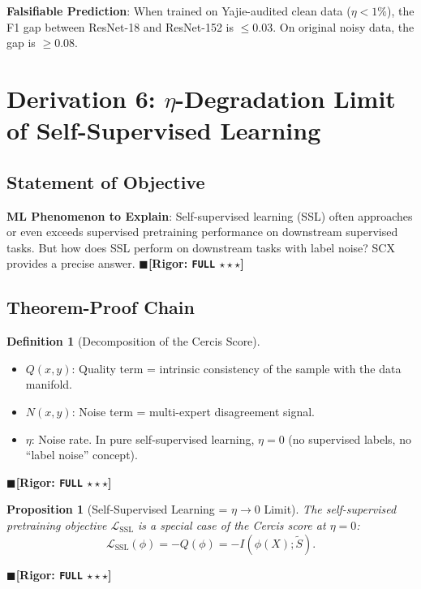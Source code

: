 \documentclass[12pt,a4paper]{article}
\newtheorem{proposition}[theorem]{Proposition}
\theoremstyle{definition}
\newtheorem{definition}{Definition}[section]
\theoremstyle{remark}
\newcommand{\rigorFull}{$\blacksquare$\;\textbf{[Rigor: \texttt{FULL} $\star\star\star$]}}
\begin{document}
\textbf{Falsifiable Prediction}: When trained on Yajie-audited clean data ($\eta < 1\%$), the F1 gap between ResNet-18 and ResNet-152 is $\leq 0.03$. On original noisy data, the gap is $\geq 0.08$.

\section{Derivation 6: $\eta$-Degradation Limit of Self-Supervised Learning}
\label{sec:ssl}

\subsection{Statement of Objective}
\textbf{ML Phenomenon to Explain}: Self-supervised learning (SSL) often approaches or even exceeds supervised pretraining performance on downstream supervised tasks. But how does SSL perform on downstream tasks with label noise? SCX provides a precise answer.
\rigorFull

\subsection{Theorem-Proof Chain}

\begin{definition}[Decomposition of the Cercis Score]
\begin{itemize}
\item $Q(x, y)$: Quality term = intrinsic consistency of the sample with the data manifold.
\item $N(x, y)$: Noise term = multi-expert disagreement signal.
\item $\eta$: Noise rate. In pure self-supervised learning, $\eta = 0$ (no supervised labels, no ``label noise'' concept).
\end{itemize}
\end{definition}
\rigorFull

\begin{proposition}[Self-Supervised Learning = $\eta \to 0$ Limit]
\label{prop:13}
The self-supervised pretraining objective $\mathcal{L}_{\text{SSL}}$ is a special case of the Cercis score at $\eta = 0$:
\begin{equation}
\mathcal{L}_{\text{SSL}}(\phi) = -Q(\phi) = -I(\phi(X); \tilde{S}).
\end{equation}
\end{proposition}
\rigorFull
\end{document}
